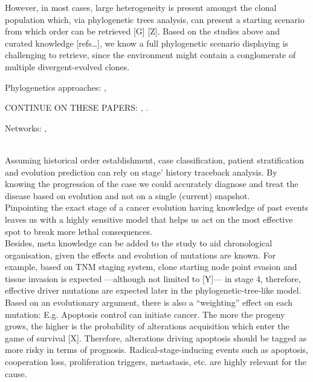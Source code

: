 However, in most cases, large heterogeneity is present amongst the clonal population which, via phylogenetic trees analysis, can present a starting scenario from which order can be retrieved [G] [Z]. Based on the studies above and curated knowledge [refs…], we know a full phylogenetic scenario displaying is challenging to retrieve, since the environment might contain a conglomerate of multiple divergent-evolved clones.

Phylogenetics approaches:
\cite{Beerenwinkel2005Mtreemix:Trees}, \cite{Rahnenfuhrer2005EstimatingScores}

CONTINUE ON THESE PAPERS:
\cite{Desper1999InferringData}, \cite{Desper2001Distance-basedOncogenesis}.

Networks:
\cite{Hjelm2006NewOncogenesis}, \cite{Gerstung2011TheTumorigenesis}

\\

Assuming historical order establishment, case classification, patient stratification and evolution prediction can rely on stage’ history traceback analysis. By knowing the progression of the case we could accurately diagnose and treat the disease based on evolution and not on a single (current) snapshot.\\

Pinpointing the exact stage of a cancer evolution having knowledge of past events leaves us with a highly sensitive model that helps us act on the most effective spot to break more lethal consequences.
\\

Besides, meta knowledge can be added to the study to aid chronological organisation, given the effects and evolution of mutations are known. For example, based on TNM staging system, clone starting node point evasion and tissue invasion is expected —although not limited to [Y]— in stage 4, therefore, effective driver mutations are expected later in the phylogenetic-tree-like model.
\\

Based on an evolutionary argument, there is also a “weighting” effect on each mutation: E.g. Apoptosis control can initiate cancer. The more the progeny grows, the higher is the probability of alterations acquisition which enter the game of survival [X]. Therefore, alterations driving apoptosis should be tagged as more risky in terms of prognosis. Radical-stage-inducing events such as apoptosis, cooperation loss, proliferation triggers, metastasis, etc. are highly relevant for the cause.
\\


